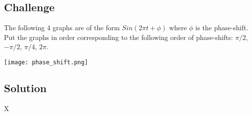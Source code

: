 \subsection*{Challenge}

The following 4 graphs are of the form $Sin(2 \pi t + \phi)$ where $\phi$ is the phase-shift. Put the graphs in order corresponding to the following order of phase-shifts: $\pi/2$, $-\pi/2$, $\pi/4$, $2 \pi$.

\texttt{[image: phase\_shift.png]}

\subsection*{Solution}
X

